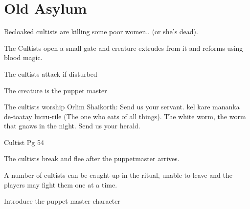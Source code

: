 \documentclass[a4paper]{dnd5}
\begin{document}
\section*{Old Asylum}

\begin{precis}
\item Becloaked cultists are killing some poor women.. (or she's dead).
\item The Cultists open a small gate and creature extrudes from it and reforms using 
  blood magic.
\item The cultists attack if disturbed
\item The creature is the puppet master
\item The cultists worship Orlim Shaikorth:  Send us your servant. kel kare mananka de-toatay lucru-rile (The one who eats of all things). The white worm, the worm that gnaws in the night.  Send us your herald.
\item Cultist Pg 54
\end{precis}

\begin{outs}
\item The cultists break and flee after the puppetmaster arrives.
\item A number of cultists can be caught up in the ritual, unable to leave and the players may fight them one at a time.
\end{outs}

\begin{purpose}
\item Introduce the puppet master character
\item 
\end{purpose}
     
\end{document}
